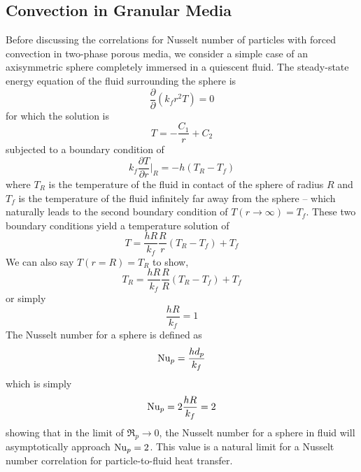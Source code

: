 \subsection{Convection in Granular Media}\label{sec:particle-convection}
Before discussing the correlations for Nusselt number of particles with forced convection in two-phase porous media, we consider a simple case of an axisymmetric sphere completely immersed in a quiescent fluid. The steady-state energy equation of the fluid surrounding the sphere is 
\begin{equation}
    \frac{\partial}{\partial}(k_fr^2T) = 0
\end{equation}
for which the solution is 
\begin{equation}
    T = -\frac{C_1}{r} + C_2
\end{equation}
subjected to a boundary condition of
\begin{equation}
    k_f\frac{\partial T}{\partial r}\Bigg|_R = -h(T_R - T_f)
\end{equation}
where $T_R$ is the temperature of the fluid in contact of the sphere of radius $R$ and $T_f$ is the temperature of the fluid infinitely far away from the sphere -- which naturally leads to the second boundary condition of $T(r\rightarrow\infty) = T_f$. These two boundary conditions yield a temperature solution of 
\begin{equation}
    T = \frac{hR}{k_f}\frac{R}{r}(T_R -T_f) + T_f
\end{equation}
We can also say $T(r = R) = T_R$ to show,
\begin{equation}
    T_R = \frac{hR}{k_f}\frac{R}{R}(T_R -T_f) + T_f
\end{equation}
or simply
\begin{equation}
    \frac{hR}{k_f} = 1
\end{equation}
The Nusselt number for a sphere is defined as
\begin{equation}
    \mathrm{Nu}_p = \frac{hd_p}{k_f}
\end{equation}
which is simply
\begin{equation}
    \mathrm{Nu}_p = 2\frac{hR}{k_f} = 2
\end{equation}
showing that in the limit of $\Re_p \rightarrow 0$, the Nusselt number for a sphere in fluid will asymptotically approach $\mathrm{Nu}_p = 2$. This value is a natural limit for a Nusselt number correlation for particle-to-fluid heat transfer. 

